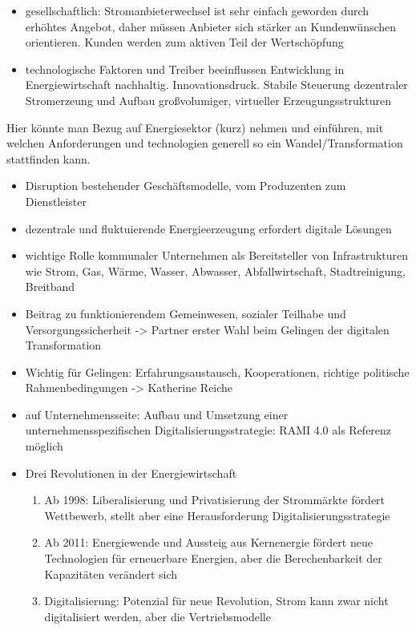 \begin{itemize}
  \item gesellschaftlich: Stromanbieterwechsel ist sehr einfach geworden durch erhöhtes Angebot, daher müssen Anbieter sich stärker an Kundenwünschen orientieren. Kunden werden zum aktiven Teil der Wertschöpfung
  \item technologische Faktoren und Treiber beeinflussen Entwicklung in Energiewirtschaft nachhaltig. Innovationsdruck. Stabile Steuerung dezentraler Stromerzeung und Aufbau großvolumiger, virtueller Erzeugungsstrukturen
\end{itemize}


Hier könnte man Bezug auf Energiesektor (kurz) nehmen und einführen, mit welchen Anforderungen und technologien generell so ein Wandel/Transformation stattfinden kann.
\begin{itemize}
  \item Disruption bestehender Geschäftsmodelle, vom Produzenten zum Dienstleister \citep{Doleski2017}
  \item dezentrale und fluktuierende Energieerzeugung erfordert digitale Lösungen
  \item wichtige Rolle kommunaler Unternehmen als Bereitsteller von Infrastrukturen wie Strom, Gas, Wärme, Wasser, Abwasser, Abfallwirtschaft, Stadtreinigung, Breitband \citep{Doleski2017}
  \item Beitrag zu funktionierendem Gemeinwesen, sozialer Teilhabe und Versorgungssicherheit -> Partner erster Wahl beim Gelingen der digitalen Transformation
  \item Wichtig für Gelingen: Erfahrungsaustausch, Kooperationen, richtige politische Rahmenbedingungen -> Katherine Reiche
  \item auf Unternehmensseite: Aufbau und Umsetzung einer unternehmensspezifischen Digitalisierungsstrategie: RAMI 4.0 als Referenz möglich
  \item Drei Revolutionen in der Energiewirtschaft \citep{Doleski2017}
  \begin{enumerate}
    \item Ab 1998: Liberalisierung und Privatisierung der Strommärkte fördert Wettbewerb, stellt aber eine Herausforderung Digitalisierungsstrategie
    \item Ab 2011: Energiewende und Aussteig aus Kernenergie fördert neue Technologien für erneuerbare Energien, aber die Berechenbarkeit der Kapazitäten verändert sich
    \item Digitalisierung: Potenzial für neue Revolution, Strom kann zwar nicht digitalisiert werden, aber die Vertriebsmodelle

\end{enumerate}
\end{itemize}
